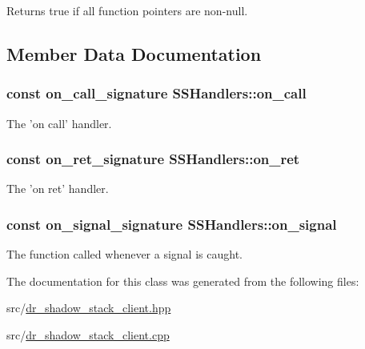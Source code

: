Returns true if all function pointers are non-\/null. 



\subsection{Member Data Documentation}
\hypertarget{class_s_s_handlers_a2cd9221058871db09200f523f78bfb03}{
\subsubsection[{on\-\_\-call}]{\setlength{\rightskip}{0pt plus 5cm}const {\bf on\-\_\-call\-\_\-signature} S\-S\-Handlers\-::on\-\_\-call}}\label{class_s_s_handlers_a2cd9221058871db09200f523f78bfb03}


The 'on call' handler. 

\hypertarget{class_s_s_handlers_a2044718e6183b14442c9bc9295b3dda2}{
\subsubsection[{on\-\_\-ret}]{\setlength{\rightskip}{0pt plus 5cm}const {\bf on\-\_\-ret\-\_\-signature} S\-S\-Handlers\-::on\-\_\-ret}}\label{class_s_s_handlers_a2044718e6183b14442c9bc9295b3dda2}


The 'on ret' handler. 

\hypertarget{class_s_s_handlers_a9933cca29ab671706a5df494e3fb3532}{
\subsubsection[{on\-\_\-signal}]{\setlength{\rightskip}{0pt plus 5cm}const {\bf on\-\_\-signal\-\_\-signature} S\-S\-Handlers\-::on\-\_\-signal}}\label{class_s_s_handlers_a9933cca29ab671706a5df494e3fb3532}


The function called whenever a signal is caught. 



The documentation for this class was generated from the following files\-:\begin{DoxyCompactItemize}
\item 
src/\hyperlink{dr__shadow__stack__client_8hpp}{dr\-\_\-shadow\-\_\-stack\-\_\-client.\-hpp}\item 
src/\hyperlink{dr__shadow__stack__client_8cpp}{dr\-\_\-shadow\-\_\-stack\-\_\-client.\-cpp}\end{DoxyCompactItemize}
